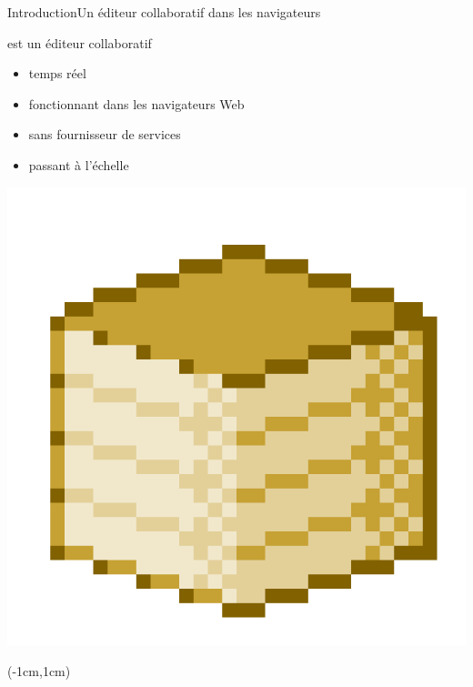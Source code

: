\begin{frame}{Introduction}{Un éditeur collaboratif dans les navigateurs}
  

  \begin{minipage}{0.69\textwidth}
    \CRATE est un éditeur collaboratif 
    \begin{itemize}
    \item temps réel \YES{\cmark}
    \item fonctionnant dans les navigateurs Web \YES{\cmark}
    \item sans fournisseur de services \YES{\cmark}
    \item passant à l'échelle \YES{\cmark}
    \end{itemize}
  \end{minipage}
  \begin{minipage}{0.3\textwidth}
    \includegraphics[width=\textwidth,interpolate=false]{img/crateicon.png}
  \end{minipage}
    
  
  \begin{textblock*}{1.18\textwidth}(-1cm,1cm)
  \end{textblock*}
  
  \vspace{1cm}

\end{frame}


